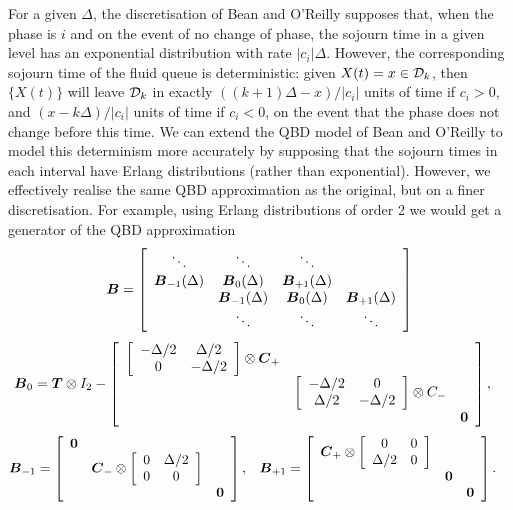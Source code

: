 For a given \(\Delta\), the discretisation of Bean and O'Reilly supposes that, when the phase is \(i\) and on the event of no change of phase, the sojourn time in a given level has an exponential distribution with rate \(|c_i|\Delta\). However, the corresponding sojourn time of the fluid queue is deterministic: given \(X(t) = x \in\mathcal{D}_k\), then \(\{X(t)\}\) will leave \(\mathcal{D}_k\) in exactly \(((k+1)\Delta - x)/|c_i|\) units of time if \(c_i>0\), and \((x-k\Delta)/|c_i|\) units of time if \(c_i<0\), on the event that the phase does not change before this time. We can extend the QBD model of Bean and O'Reilly to model this determinism more accurately by supposing that the sojourn times in each interval have Erlang distributions (rather than exponential). However, we effectively realise the same QBD approximation as the original, but on a finer discretisation. For example, using Erlang distributions of order 2 we would get a generator of the QBD approximation
\[\boldsymbol B = \left[ \begin{array}{cccc} \ddots & \ddots & \ddots & \\ \boldsymbol B_{-1}(\Delta) & \boldsymbol B_0(\Delta) & \boldsymbol B_{+1}(\Delta) & \\  & \boldsymbol B_{-1}(\Delta) & \boldsymbol B_0(\Delta) & \boldsymbol B_{+1}(\Delta) \\ & \ddots & \ddots & \ddots \end{array} \right]\]
\begin{align}
\boldsymbol B_0 &= \boldsymbol T\otimes I_2 - \left[ \begin{array}{ccc} \left[\begin{array}{cc} -\Delta/2 & \Delta/2 \\ 0 & -\Delta/2 \end{array}\right] \otimes \boldsymbol C_+ & & \\ & \left[\begin{array}{cc} -\Delta/2 & 0 \\ \Delta/2 & -\Delta/2 \end{array}\right] \otimes C_- & \\ & & \boldsymbol 0 \end{array}\right], 
\end{align}
\begin{align}
\boldsymbol B_{-1} &= \left[\begin{array}{ccc} \boldsymbol 0 & & \\ & \boldsymbol C_-\otimes \left[\begin{array}{cc} 0 & \Delta/2 \\ 0 & 0 \end{array}\right] & \\ & & \boldsymbol 0 \end{array}\right],
&&\boldsymbol B_{+1} = \left[\begin{array}{ccc} \boldsymbol C_+\otimes \left[\begin{array}{cc} 0 & 0 \\ \Delta/2 & 0 \end{array}\right] & & \\ & \boldsymbol 0 & \\ & & \boldsymbol 0\end{array}\right].
\end{align}
